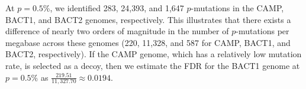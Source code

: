 At $p=0.5$\%, we identified 283, 24,393, and 1,647 $p$-mutations in the CAMP, BACT1, and BACT2 genomes, respectively. This illustrates that there exists a difference of nearly two orders of magnitude in the number of $p$-mutations per megabase across these genomes (220, 11,328, and 587 for CAMP, BACT1, and BACT2, respectively). If the CAMP genome, which has a relatively low mutation rate, is selected as a decoy, then we estimate the FDR for the BACT1 genome at $p=0.5\%$ as $\frac{219.51}{11,327.70} \approx 0.0194$.\endinput